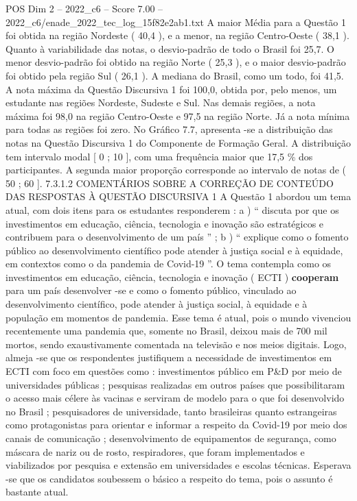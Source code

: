 \begin{textsample}{POS Dim 2 – 2022\_c6 – Score 7.00 – 2022\_c6/enade\_2022\_tec\_log\_15f82e2ab1.txt}
A maior Média para a Questão 1 foi obtida na região Nordeste ( 40,4 ), e a menor, na região Centro-Oeste ( 38,1 ).
Quanto à variabilidade das notas, o desvio-padrão de todo o Brasil foi 25,7.
O menor desvio-padrão foi obtido na região Norte ( 25,3 ), e o maior desvio-padrão foi obtido pela região Sul ( 26,1 ).
A mediana do Brasil, como um todo, foi 41,5.
A nota máxima da Questão Discursiva 1 foi 100,0, obtida por, pelo menos, um estudante nas regiões Nordeste, Sudeste e Sul.
Nas demais regiões, a nota máxima foi 98,0 na região Centro-Oeste e 97,5 na região Norte.
Já a nota mínima para todas as regiões foi zero.
No Gráfico 7.7, apresenta -se a distribuição das notas na Questão Discursiva 1 do Componente de Formação Geral.
A distribuição tem intervalo modal [ 0 ; 10 ], com uma frequência maior que 17,5 \% dos participantes.
A segunda maior proporção corresponde ao intervalo de notas de ( 50 ; 60 ]. 7.3.1.2 COMENTÁRIOS SOBRE A CORREÇÃO DE CONTEÚDO DAS RESPOSTAS À QUESTÃO DISCURSIVA 1 A Questão 1 abordou um tema atual, com dois itens para os estudantes responderem : a ) “ discuta por que os investimentos em educação, ciência, tecnologia e inovação são estratégicos e contribuem para o desenvolvimento de um país ” ; b ) “ explique como o fomento público ao desenvolvimento científico pode atender à justiça social e à equidade, em contextos como o da pandemia de Covid-19 ”.
O tema contempla como os investimentos em educação, ciência, tecnologia e inovação ( ECTI ) \textbf{cooperam} para um país desenvolver -se e como o fomento público, vinculado ao desenvolvimento científico, pode atender à justiça social, à equidade e à população em momentos de pandemia.
Esse tema é atual, pois o mundo vivenciou recentemente uma pandemia que, somente no Brasil, deixou mais de 700 mil mortos, sendo exaustivamente comentada na televisão e nos meios digitais.
Logo, almeja -se que os respondentes justifiquem a necessidade de investimentos em ECTI com foco em questões como : investimentos público em P\&D por meio de universidades públicas ; pesquisas realizadas em outros países que possibilitaram o acesso mais célere às vacinas e serviram de modelo para o que foi desenvolvido no Brasil ; pesquisadores de universidade, tanto brasileiras quanto estrangeiras como protagonistas para orientar e informar a respeito da Covid-19 por meio dos canais de comunicação ; desenvolvimento de equipamentos de segurança, como máscara de nariz ou de rosto, respiradores, que foram implementados e viabilizados por pesquisa e extensão em universidades e escolas técnicas.
Esperava -se que os candidatos soubessem o básico a respeito do tema, pois o assunto é bastante atual.

\end{textsample}
